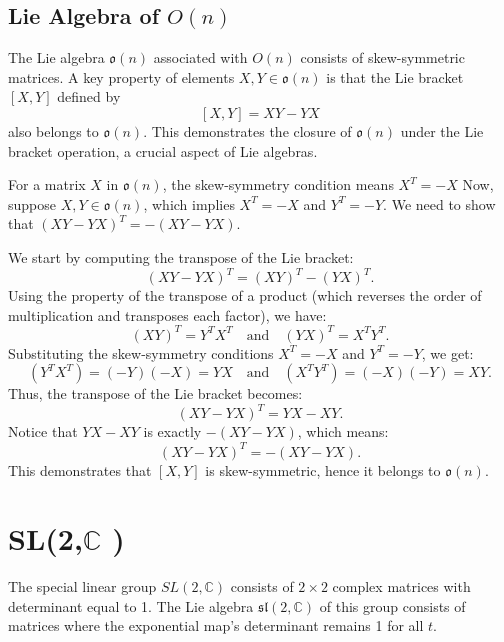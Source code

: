 \documentclass{article}
\begin{document}
\subsection*{Lie Algebra of \(O(n)\)}
The Lie algebra \(\mathfrak{o}(n)\) associated with \(O(n)\) consists of skew-symmetric matrices. A key property of elements \(X, Y \in \mathfrak{o}(n)\) is that the Lie bracket \([X,Y]\) defined by
\[
[X,Y] = XY - YX
\]
also belongs to \(\mathfrak{o}(n)\). This demonstrates the closure of \(\mathfrak{o}(n)\) under the Lie bracket operation, a crucial aspect of Lie algebras.

For a matrix \(X\) in \(\mathfrak{o}(n)\), the skew-symmetry condition means \(X^T = -X\)
Now, suppose \(X, Y \in \mathfrak{o}(n)\), which implies \(X^T = -X\) and \(Y^T = -Y\). We need to show that \((XY - YX)^T = -(XY - YX)\).

We start by computing the transpose of the Lie bracket:
\[
(XY - YX)^T = (XY)^T - (YX)^T.
\]
Using the property of the transpose of a product (which reverses the order of multiplication and transposes each factor), we have:
\[
(XY)^T = Y^T X^T \quad \text{and} \quad (YX)^T = X^T Y^T.
\]
Substituting the skew-symmetry conditions \(X^T = -X\) and \(Y^T = -Y\), we get:
\[
(Y^T X^T) = (-Y)(-X) = YX \quad \text{and} \quad (X^T Y^T) = (-X)(-Y) = XY.
\]
Thus, the transpose of the Lie bracket becomes:
\[
(XY - YX)^T = YX - XY.
\]
Notice that \(YX - XY\) is exactly \(-(XY - YX)\), which means:
\[
(XY - YX)^T = -(XY - YX).
\]
This demonstrates that \([X, Y]\) is skew-symmetric, hence it belongs to \(\mathfrak{o}(n)\).

\section{SL(2,\( \mathbb{C}\) )}

The special linear group \(SL(2, \mathbb{C})\) consists of \(2 \times 2\) complex matrices with determinant equal to 1. The Lie algebra \(\mathfrak{sl}(2, \mathbb{C})\) of this group consists of matrices where the exponential map's determinant remains 1 for all \(t\).
\end{document}
